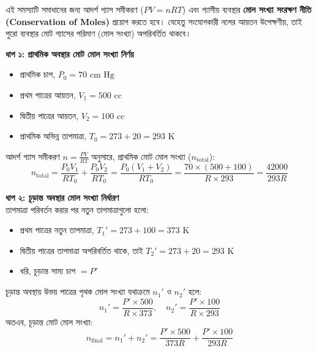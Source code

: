 \documentclass[12pt, a4paper]{article}
\begin{document}
\begin{tcolorbox}[solutionbox={সমাধান (Solution)}]
    \noindent
    এই সমস্যাটি সমাধানের জন্য আদর্শ গ্যাস সমীকরণ ($PV = nRT$) এবং গ্যাসীয় ব্যবস্থার \textbf{মোল সংখ্যা সংরক্ষণ নীতি (Conservation of Moles)} প্রয়োগ করতে হবে। যেহেতু সংযোগকারী নলের আয়তন উপেক্ষণীয়, তাই পুরো ব্যবস্থার মোট গ্যাসের পরিমাণ (মোল সংখ্যা) অপরিবর্তিত থাকবে।
    
    \vspace{0.4em}
    \noindent\textbf{ধাপ ১: প্রাথমিক অবস্থার মোট মোল সংখ্যা নির্ণয়}
    \begin{itemize}[leftmargin=1.5em, itemsep=0.2em]
        \item প্রাথমিক চাপ, $P_0 = 70\text{ cm Hg}$
        \item প্রথম পাত্রের আয়তন, $V_1 = 500\text{ cc}$
        \item দ্বিতীয় পাত্রের আয়তন, $V_2 = 100\text{ cc}$
        \item প্রাথমিক অভিন্ন তাপমাত্রা, $T_0 = 273 + 20 = 293\text{ K}$
    \end{itemize}
    আদর্শ গ্যাস সমীকরণ $n = \frac{PV}{RT}$ অনুসারে, প্রাথমিক মোট মোল সংখ্যা ($n_{\text{total}}$):
    \[ n_{\text{total}} = \frac{P_0 V_1}{R T_0} + \frac{P_0 V_2}{R T_0} = \frac{P_0 (V_1 + V_2)}{R T_0} = \frac{70 \times (500 + 100)}{R \times 293} = \frac{42000}{293 R} \]
    
    \vspace{0.4em}
    \noindent\textbf{ধাপ ২: চূড়ান্ত অবস্থার মোল সংখ্যা নির্ধারণ} \\
    তাপমাত্রা পরিবর্তন করার পর নতুন তাপমাত্রাগুলো হলো:
    \begin{itemize}[leftmargin=1.5em, itemsep=0.2em]
        \item প্রথম পাত্রের নতুন তাপমাত্রা, $T_1' = 273 + 100 = 373\text{ K}$
        \item দ্বিতীয় পাত্রের তাপমাত্রা অপরিবর্তিত থাকে, তাই $T_2' = 273 + 20 = 293\text{ K}$
        \item ধরি, চূড়ান্ত সাম্য চাপ $= P'$
    \end{itemize}
    চূড়ান্ত অবস্থায় উভয় পাত্রের পৃথক মোল সংখ্যা যথাক্রমে $n_1'$ ও $n_2'$ হলে:
    \[ n_1' = \frac{P' \times 500}{R \times 373}, \quad n_2' = \frac{P' \times 100}{R \times 293} \]
    অতএব, চূড়ান্ত মোট মোল সংখ্যা:
    \[ n_{\text{final}} = n_1' + n_2' = \frac{P' \times 500}{373 R} + \frac{P' \times 100}{293 R} \]
    

\end{tcolorbox}
\end{document}
